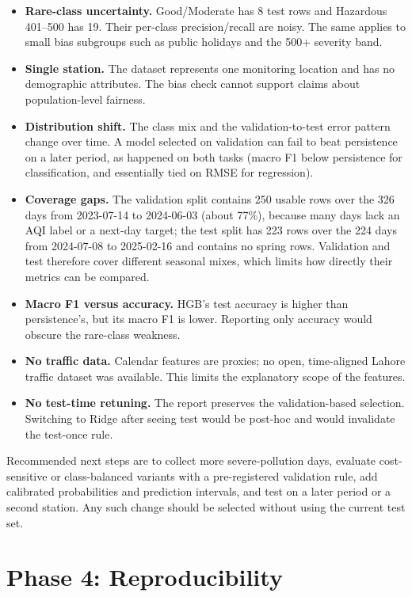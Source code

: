 \documentclass[11pt]{article}
\begin{document}
\begin{itemize}[leftmargin=1.4em]
  \item \textbf{Rare-class uncertainty.} Good/Moderate has 8 test rows and Hazardous 401--500 has 19. Their per-class precision/recall are noisy. The same applies to small bias subgroups such as public holidays and the 500+ severity band.
  \item \textbf{Single station.} The dataset represents one monitoring location and has no demographic attributes. The bias check cannot support claims about population-level fairness.
  \item \textbf{Distribution shift.} The class mix and the validation-to-test error pattern change over time. A model selected on validation can fail to beat persistence on a later period, as happened on both tasks (macro F1 below persistence for classification, and essentially tied on RMSE for regression).
  \item \textbf{Coverage gaps.} The validation split contains 250 usable rows over the 326 days from 2023-07-14 to 2024-06-03 (about 77\%), because many days lack an AQI label or a next-day target; the test split has 223 rows over the 224 days from 2024-07-08 to 2025-02-16 and contains no spring rows. Validation and test therefore cover different seasonal mixes, which limits how directly their metrics can be compared.
  \item \textbf{Macro F1 versus accuracy.} HGB's test accuracy is higher than persistence's, but its macro F1 is lower. Reporting only accuracy would obscure the rare-class weakness.
  \item \textbf{No traffic data.} Calendar features are proxies; no open, time-aligned Lahore traffic dataset was available. This limits the explanatory scope of the features.
  \item \textbf{No test-time retuning.} The report preserves the validation-based selection. Switching to Ridge after seeing test would be post-hoc and would invalidate the test-once rule.
\end{itemize}

Recommended next steps are to collect more severe-pollution days, evaluate cost-sensitive or class-balanced variants with a pre-registered validation rule, add calibrated probabilities and prediction intervals, and test on a later period or a second station. Any such change should be selected without using the current test set.

\section{Phase 4: Reproducibility}
\end{document}
